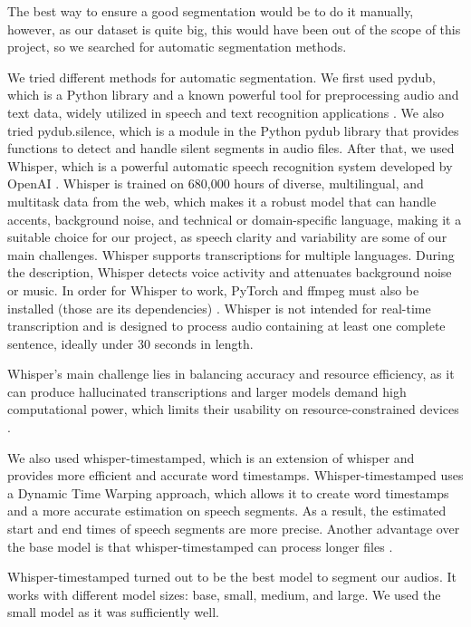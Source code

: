 \documentclass[a4paper]{article}
\begin{document}
	The best way to ensure a good segmentation would be to do it manually, however, as our dataset is quite big, this would have been out of the scope of this project, so we searched for automatic segmentation methods.
	
	We tried different methods for automatic segmentation. We first used pydub, which is a Python library and a known powerful tool for preprocessing audio and text data, widely utilized in speech and text recognition applications \cite{Kulkarni2023}. We also tried pydub.silence, which is a module in the Python pydub library that provides functions to detect and handle silent segments in audio files. After that, we used Whisper, which is a powerful automatic speech recognition system developed by OpenAI \cite{OpenAI2022}. Whisper is trained on 680,000 hours of diverse, multilingual, and multitask data from the web, which makes it a robust model that can handle accents, background noise, and technical or domain-specific language, making it a suitable choice for our project, as speech clarity and variability are some of our main challenges. Whisper supports transcriptions for multiple languages. During the description, Whisper detects voice activity and attenuates background noise or music. In order for Whisper to work, PyTorch and ffmpeg must also be installed (those are its dependencies) \cite{Andreyev2025}. Whisper is not intended for real-time transcription and is designed to process audio containing at least one complete sentence, ideally under 30 seconds in length.
	
	Whisper's main challenge lies in balancing accuracy and resource efficiency, as it can produce hallucinated transcriptions and larger models demand high computational power, which limits their usability on resource-constrained devices \cite{Andreyev2025}.
	
	We also used whisper-timestamped, which is an extension of whisper and provides more efficient and accurate word timestamps. Whisper-timestamped uses a Dynamic Time Warping approach, which allows it to create word timestamps and a more accurate estimation on speech segments. As a result, the estimated start and end times of speech segments are more precise. Another advantage over the base model is that whisper-timestamped can process longer files \cite{Andreyev2025}.
	
	Whisper-timestamped turned out to be the best model to segment our audios. It works with different model sizes: base, small, medium, and large. We used the small model as it was sufficiently well.
	
\end{document}
